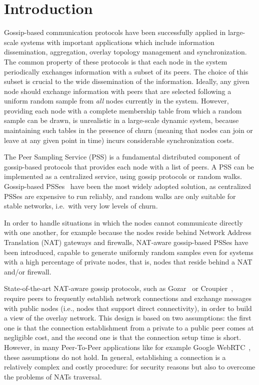 
\chapter*{Introduction} %
\label{sommario}

Gossip-based communication protocols have been successfully applied in large-scale systems with important applications which include information dissemination, aggregation, overlay topology management and synchronization. The common property of these protocols is that each node in the system periodically exchanges information with a subset of its peers. The choice of this subset is crucial to the wide dissemination of the information. Ideally, any given node should exchange information with peers that are selected following a uniform random sample from \textit{all} nodes currently in the system. However, providing each node with a complete membership table from which a random sample can be drawn, is unrealistic in a large-scale dynamic system, because maintaining such tables in the presence of churn (meaning that nodes can join or leave at any given point in time) incurs considerable synchronization costs. 

The Peer Sampling Service (PSS) is a fundamental distributed component of gossip-based protocols that provides each node with a list of peers. A PSS can be implemented as a centralized service, using gossip protocols or random walks. Gossip-based PSSes~\cite{gossip_protocol} have been the most widely adopted solution, as centralized PSSes are expensive to run reliably, and random walks are only suitable for stable networks, i.e.\ with very low levels of churn. 

In order to handle situations in which the nodes cannot communicate directly with one another, for example because the nodes reside behind Network Address Translation (NAT) gateways and firewalls, NAT-aware gossip-based PSSes have been introduced, capable to generate uniformly random samples even for systems with a high percentage of private nodes, that is, nodes that reside behind a NAT and/or firewall. 

State-of-the-art NAT-aware gossip protocols, such as Gozar~\cite{gozar} or Croupier~\cite{croupier}, require peers to frequently establish network connections and exchange messages with public nodes (i.e., nodes that support direct connectivity), in order to build a view of the overlay network. This design is based on two assumptions: the first one is that the connection establishment from a private to a public peer comes at negligible cost, and the second one is that the connection setup time is short. However, in many Peer-To-Peer applications like for example Google WebRTC~\cite{webrtc}, these assumptions do not hold. In general, establishing a connection is a relatively complex and costly procedure: for security reasons but also to overcome the problems of NATs traversal. 

